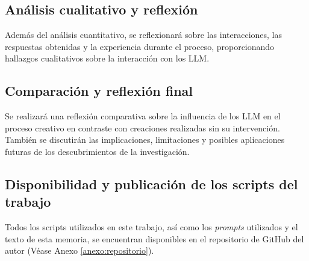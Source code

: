 \subsection{Análisis cualitativo y reflexión}
Además del análisis cuantitativo, se reflexionará sobre las interacciones, las respuestas obtenidas y la experiencia durante el proceso, proporcionando hallazgos cualitativos sobre la interacción con los LLM.

\subsection{Comparación y reflexión final}
Se realizará una reflexión comparativa sobre la influencia de los LLM en el proceso creativo en contraste con creaciones realizadas sin su intervención. También se discutirán las implicaciones, limitaciones y posibles aplicaciones futuras de los descubrimientos de la investigación.

\subsection{Disponibilidad y publicación de los scripts del trabajo}
Todos los scripts utilizados en este trabajo, así como los \emph{prompts} utilizados y el texto de esta memoria, se encuentran disponibles en el repositorio de GitHub del autor (Véase Anexo \ref{anexo:repositorio}).